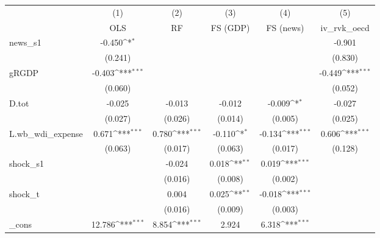 {
\def\sym#1{\ifmmode^{#1}\else\(^{#1}\)\fi}
\begin{tabular}{l*{5}{c}}
\toprule
            &\multicolumn{1}{c}{(1)}&\multicolumn{1}{c}{(2)}&\multicolumn{1}{c}{(3)}&\multicolumn{1}{c}{(4)}&\multicolumn{1}{c}{(5)}\\
            &\multicolumn{1}{c}{OLS}&\multicolumn{1}{c}{RF}&\multicolumn{1}{c}{FS (GDP)}&\multicolumn{1}{c}{FS (news)}&\multicolumn{1}{c}{iv\_rvk\_oecd}\\
\midrule
news\_s1     &      -0.450\sym{*}  &                     &                     &                     &      -0.901         \\
            &     (0.241)         &                     &                     &                     &     (0.830)         \\
\addlinespace
gRGDP       &      -0.403\sym{***}&                     &                     &                     &      -0.449\sym{***}\\
            &     (0.060)         &                     &                     &                     &     (0.052)         \\
\addlinespace
D.tot       &      -0.025         &      -0.013         &      -0.012         &      -0.009\sym{*}  &      -0.027         \\
            &     (0.027)         &     (0.026)         &     (0.014)         &     (0.005)         &     (0.025)         \\
\addlinespace
L.wb\_wdi\_expense&       0.671\sym{***}&       0.780\sym{***}&      -0.110\sym{*}  &      -0.134\sym{***}&       0.606\sym{***}\\
            &     (0.063)         &     (0.017)         &     (0.063)         &     (0.017)         &     (0.128)         \\
\addlinespace
shock\_s1    &                     &      -0.024         &       0.018\sym{**} &       0.019\sym{***}&                     \\
            &                     &     (0.016)         &     (0.008)         &     (0.002)         &                     \\
\addlinespace
shock\_t     &                     &       0.004         &       0.025\sym{**} &      -0.018\sym{***}&                     \\
            &                     &     (0.016)         &     (0.009)         &     (0.003)         &                     \\
\addlinespace
\_cons      &      12.786\sym{***}&       8.854\sym{***}&       2.924         &       6.318\sym{***}&                     \\

\end{tabular}}
